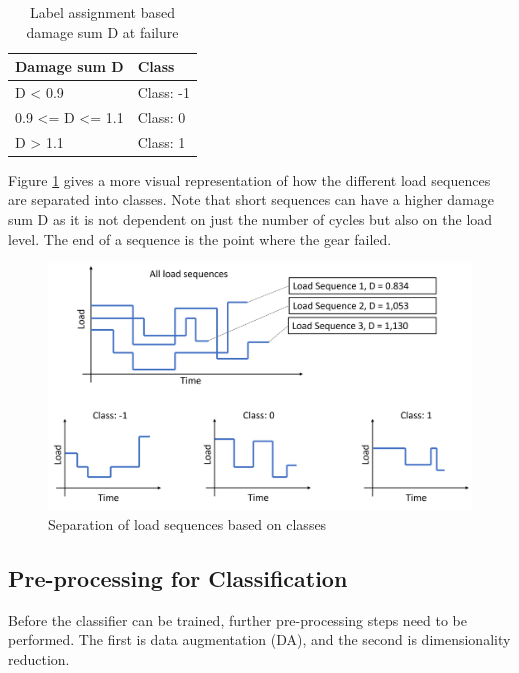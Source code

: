 \begin{table}
	\begin{center}
		\begin{tabular}{|| l | l ||}
			\hline
			\rule{0pt}{2ex}Damage sum D & Class\\
			\hline
			\hline
			\rule{0pt}{2ex}D < 0.9 & Class: -1\\\hline
			0.9 <= D <= 1.1 & Class:  0\\	\hline
			D > 1.1 & Class:  1\\\hline
			\hline
		\end{tabular}
		\caption{Label assignment based damage sum D at failure}
		\label{DamageClass}
	\end{center}
	\vspace{-4mm}
\end{table}


Figure \ref{fig:SBC1} gives a more visual representation of how the different load sequences are separated into classes. Note that short sequences can have a higher damage sum D as it is not dependent on just the number of cycles but also on the load level. The end of a sequence is the point where the gear failed. 

\begin{figure}[H]
	\centering
	\includegraphics[width=0.9\linewidth]{IMGs/SBC1.png}
	\caption{Separation of load sequences based on classes}
	\label{fig:SBC1}
\end{figure}

\subsection{Pre-processing for Classification}\label{prep_class}
Before the classifier can be trained, further pre-processing steps need to be performed. The first is data augmentation (DA), and the second is dimensionality reduction. 

